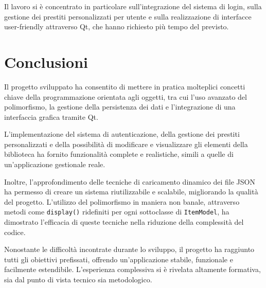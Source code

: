 \documentclass[a4paper,10pt]{article}
\begin{document}
Il lavoro si è concentrato in particolare sull'integrazione del sistema di login, sulla gestione dei prestiti personalizzati per utente e sulla realizzazione di interfacce user-friendly attraverso Qt, che hanno richiesto più tempo del previsto.

\section{Conclusioni}

Il progetto sviluppato ha consentito di mettere in pratica molteplici concetti chiave della programmazione orientata agli oggetti, tra cui l'uso avanzato del polimorfismo, la gestione della persistenza dei dati e l'integrazione di una interfaccia grafica tramite Qt.

L'implementazione del sistema di autenticazione, della gestione dei prestiti personalizzati e della possibilità di modificare e visualizzare gli elementi della biblioteca ha fornito funzionalità complete e realistiche, simili a quelle di un'applicazione gestionale reale.

Inoltre, l'approfondimento delle tecniche di caricamento dinamico dei file JSON ha permesso di creare un sistema riutilizzabile e scalabile, migliorando la qualità del progetto. L'utilizzo del polimorfismo in maniera non banale, attraverso metodi come \texttt{display()} ridefiniti per ogni sottoclasse di \texttt{ItemModel}, ha dimostrato l'efficacia di queste tecniche nella riduzione della complessità del codice.

Nonostante le difficoltà incontrate durante lo sviluppo, il progetto ha raggiunto tutti gli obiettivi prefissati, offrendo un'applicazione stabile, funzionale e facilmente estendibile. L'esperienza complessiva si è rivelata altamente formativa, sia dal punto di vista tecnico sia metodologico.
\end{document}
